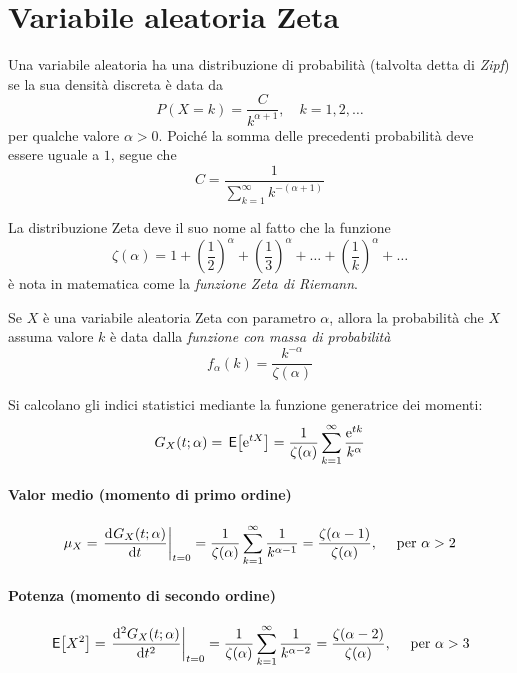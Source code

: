 \section{Variabile aleatoria Zeta}
Una variabile aleatoria ha una distribuzione di probabilità  (talvolta detta di \emph{Zipf}) se la sua densità discreta è data da
\begin{equation}
	P(X = k) = \frac{C}{k^{\alpha+1}},
	\quad k=1,2,\dots
\end{equation}
per qualche valore $\alpha > 0$. Poiché la somma delle precedenti probabilità deve essere uguale a $1$, segue che
\begin{equation}
	C = \frac{1}{\sum\limits_{k=1}^{\infty} k^{-(\alpha+1)}}
\end{equation}

La distribuzione Zeta deve il suo nome al fatto che la funzione
\[
	\zeta(\alpha) = 1 + \left(\frac{1}{2}\right)^\alpha + \left(\frac{1}{3}\right)^\alpha + \dots + \left(\frac{1}{k}\right)^\alpha + \dots
\]
è nota in matematica come la \emph{funzione Zeta di Riemann}.

Se $X$ è una variabile aleatoria Zeta con parametro $\alpha$, allora la probabilità che $X$ assuma valore $k$ è data dalla \emph{funzione con massa di probabilità}
\begin{equation}
	f_\alpha(k) = \frac{k^{-\alpha}}{\zeta(\alpha)}
\end{equation}

Si calcolano gli indici statistici mediante la funzione generatrice dei momenti:
\begin{equation}
	G_X(t;\alpha) = \,{\operatorname{\mathsf{E}}}\!\left[{\operatorname{e}^{tX}}\right] = \frac{1}{\zeta(\alpha)} \sum_{k=1}^\infty \frac{\operatorname{e}^{tk}}{k^{\alpha}}
\end{equation}

\paragraph{Valor medio (momento di primo ordine)}
\begin{equation}
	\mu_X = \left.{\dfrac{\mathop{}\!\mathrm{d}^{}G_X(t;\alpha)}{\mathop{}\!\mathrm{d} t^{}}}\right\rvert_{t=0} =
	\frac{1}{\zeta(\alpha)} \sum_{k=1}^\infty \frac{1}{k^{\alpha-1}} =
	\frac{\zeta(\alpha-1)}{\zeta(\alpha)},
	\quad \text{ per } \alpha > 2
\end{equation}

\paragraph{Potenza (momento di secondo ordine)}
\begin{equation}
	\,{\operatorname{\mathsf{E}}}\!\left[{X^2}\right] = \left.{\frac{\mathrm{d}^2 G_X(t;\alpha)}{\mathrm{d}t^2}}\right\rvert_{t=0} =
	\frac{1}{\zeta(\alpha)} \sum_{k=1}^\infty \frac{1}{k^{\alpha -2}} =
	\frac{\zeta(\alpha -2)}{\zeta(\alpha)},
	\quad \text{ per } \alpha > 3
\end{equation}

